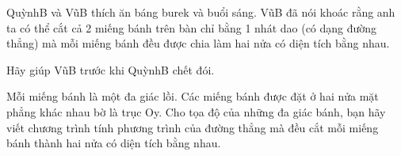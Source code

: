 QuỳnhB và VũB thích ăn báng burek và buổi sáng. VũB đã nói khoác rằng anh ta có thể cắt cả 2 miếng bánh trên bàn chỉ bằng 1 nhát dao (có dạng đường thẳng) mà mỗi miếng bánh đều được chia làm hai nửa có diện tích bằng nhau.  

   Hãy giúp VũB trước khi QuỳnhB chết đói.  





   Mỗi miếng bánh là một đa giác lồi. Các miếng bánh được đặt ở hai nửa mặt phẳng khác nhau bờ là trục Oy. Cho tọa độ của những đa giác bánh, bạn hãy viết chương trình tính phương trình của đường thẳng mà đều cắt mỗi miếng bánh thành hai nửa có diện tích bằng nhau.  

\